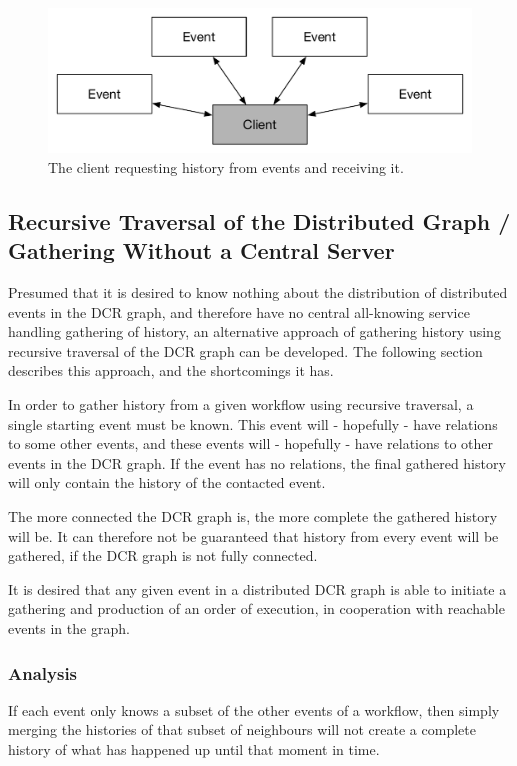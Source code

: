     \begin{figure}[H]
		\centering
		\includegraphics[height=\textheight/6]{4connect/images/server-contacts-events.pdf}
		\caption{The client requesting history from events and receiving it.}
		\label{fig:connecting:server-contacts-events}
	\end{figure}
    
    \subsection{Recursive Traversal of the Distributed Graph / Gathering Without a Central Server}
	Presumed that it is desired to know nothing about the distribution of distributed events in the DCR graph, and therefore have no central all-knowing service handling gathering of history, an alternative approach of gathering history using recursive traversal of the DCR graph can be developed. The following section describes this approach, and the shortcomings it has.   
	
	In order to gather history from a given workflow using recursive traversal, a single starting event must be known. This event will - hopefully - have relations to some other events, and these events will - hopefully - have relations to other events in the DCR graph.
	If the event has no relations, the final gathered history will only contain the history of the contacted event. 
	
	The more connected the DCR graph is, the more complete the gathered history will be. It can therefore not be guaranteed that history from every event will be gathered, if the DCR graph is not fully connected.  
	
	It is desired that any given event in a distributed DCR graph is able to initiate a gathering and production of an order of execution, in cooperation with reachable events in the graph. 
	
	\subsubsection{Analysis}
	If each event only knows a subset of the other events of a workflow, then simply merging the histories of that subset of neighbours will not create a complete history of what has happened up until that moment in time. 
	
